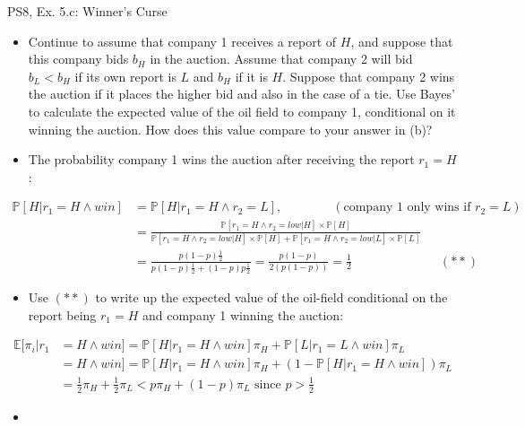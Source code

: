 \begin{frame}{PS8, Ex. 5.c: Winner's Curse}
      \begin{itemize}
        \item[(c)] Continue to assume that company 1 receives a report of $H$, and suppose that this company bids $b_H$ in the auction. Assume that company 2 will bid $b_L < b_H$ if its own report is $L$ and $b_H$ if it is $H$. Suppose that company 2 wins the auction if it places the higher bid and also in the case of a tie. Use Bayes’ to calculate the expected value of the oil field to company 1, conditional on it winning the auction. How does this value compare to your answer in (b)?
        \item[Step 1:] The probability company 1 wins the auction after receiving the report $r_1=H$:
        \end{itemize}
        \vspace{-10pt}
        \begin{align*}
          \mathbb{P}[H|r_1=H\wedge win]&=\mathbb{P}[H|r_1=H\wedge r_2=L],\quad\quad\quad\quad(\text{company 1 only wins if }r_2=L)\\
            &=\frac{\mathbb{P}[r_1=H\wedge r_2=low|H]\times\mathbb{P}[H]}{\mathbb{P}[r_1=H\wedge r_2=low|H]\times\mathbb{P}[H]+\mathbb{P}[r_1=H\wedge r_2=low|L]\times\mathbb{P}[L]}&\\
            &=\frac{p(1-p)\frac{1}{2}}{p(1-p)\frac{1}{2}+(1-p)p\frac{1}{2}}=\frac{p(1-p)}{2(p(1-p))}=\frac{1}{2}\quad\quad\quad\quad\quad\quad\quad(**)
        \end{align*}
        \vspace{-12pt}
        \begin{itemize}
        \item[Step 2:] Use $(**)$ to write up the expected value of the oil-field conditional on the report being $r_1=H$ and company 1 winning the auction:
      \end{itemize}
      \vspace{-8pt}
      \begin{align*}
        \mathbb{E}[\pi_i|r_1&=H\wedge win]=\mathbb{P}[H|r_1=H\wedge win]\pi_H+\mathbb{P}[L|r_1=L\wedge win]\pi_L\\
        &=H\wedge win]=\mathbb{P}[H|r_1=H\wedge win]\pi_H+\left(1-\mathbb{P}[H|r_1=H\wedge win]\right)\pi_L\\
        &=\frac{1}{2}\pi_H+\frac{1}{2}\pi_L<p\pi_H+(1-p)\pi_L\text{   since   }p>\frac{1}{2}
      \end{align*}
      \vspace{-14pt}
      \begin{itemize}
        \item[Step 3:] 
      \end{itemize}
      \vfill\null
\end{frame}

